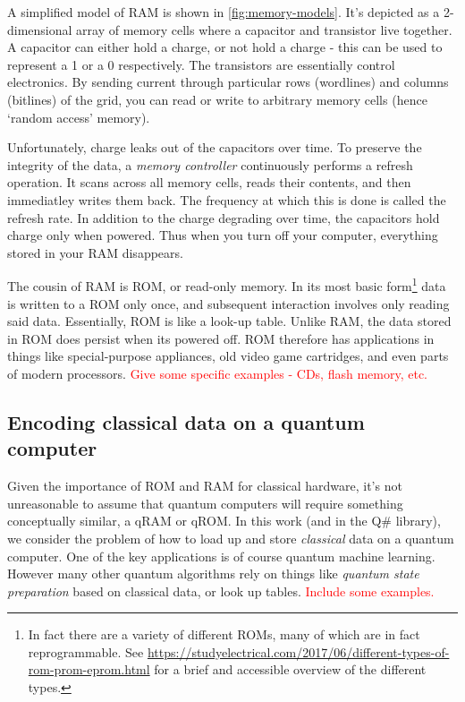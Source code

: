 \documentclass[a4paper,12pt]{article}
\newcommand\todo[1]{\textcolor{red}{#1}}
\begin{document}
A simplified model of RAM is shown in \autoref{fig:memory-models}. 
It's depicted as a 2-dimensional array of memory cells where a capacitor and transistor live together. 
A capacitor can either hold a charge, or not hold a charge - this can be used to represent a 1 or a 0 respectively. 
The transistors are essentially control electronics. 
By sending current through particular rows (wordlines) and columns (bitlines) of the grid, you can read or write to arbitrary memory cells (hence `random access' memory).


Unfortunately, charge leaks out of the capacitors over time.
To preserve the integrity of the data, a \emph{memory controller} continuously performs a refresh operation.
It scans across all memory cells, reads their contents, and then immediatley writes them back.
The frequency at which this is done is called the refresh rate.
In addition to the charge degrading over time, the capacitors hold charge only when powered.
Thus when you turn off your computer, everything stored in your RAM disappears.

The cousin of RAM is ROM, or read-only memory.
In its most basic form\footnote{In fact there are a variety of different ROMs, many of which are in fact reprogrammable. See \url{
https://studyelectrical.com/2017/06/different-types-of-rom-prom-eprom.html} for a brief and accessible overview of the different types.} data is written to a ROM only once, and subsequent interaction involves only reading said data.
Essentially, ROM is like a look-up table.
Unlike RAM, the data stored in ROM does persist when its powered off. 
ROM therefore has applications in things like special-purpose appliances, old video game cartridges, and even parts of modern processors.
\todo{Give some specific examples - CDs, flash memory, etc.}

\subsection{Encoding classical data on a quantum computer}
\label{sec:encoding}

Given the importance of ROM and RAM for classical hardware, it's not unreasonable to assume that quantum computers will require something conceptually similar, a qRAM or qROM.
In this work (and in the Q\# library), we consider the problem of how to load up and store \emph{classical} data on a quantum computer.
One of the key applications is of course quantum machine learning.
However many other quantum algorithms rely on things like \emph{quantum state preparation} based on classical data, or look up tables.
\todo{Include some examples.}
\end{document}
